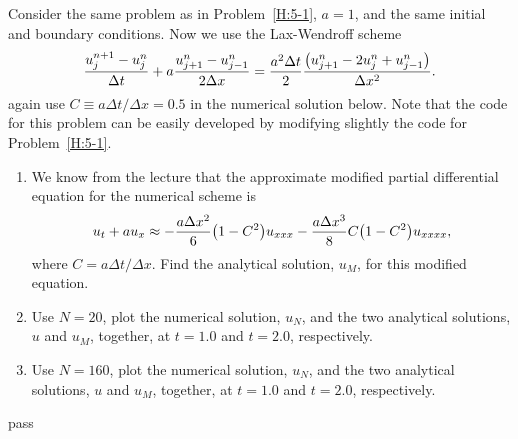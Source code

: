 \begin{homework}[label={H:5-2}]
    Consider the same problem as in Problem~\ref{H:5-1}, $a=1$, and the same initial and boundary conditions. Now we use the Lax-Wendroff scheme
    \begin{equation}\label{E:5-2-1}
        \frac{u^{n+1}_j-u^n_j}{\Delta t} + a\frac{u^n_{j+1}-u^n_{j-1}}{2\Delta x}
        =
        \frac{a^2\Delta t}{2}\frac{\qty(u^n_{j+1}-2u^n_j+u^n_{j-1})}{\Delta x^2}.
    \end{equation}
    again use $C\equiv a\Delta t/\Delta x=0.5$ in the numerical solution below. Note that the code for this problem can be easily developed by modifying slightly the code for Problem~\ref{H:5-1}.

    \begin{enumerate}[label=(\alph*)]
        \item We know from the lecture that the approximate modified partial differential equation for the numerical scheme is
            \begin{equation}\label{E:5-2-2}
                u_t+au_x
                \approx
                -\frac{a\Delta x^2}{6}\qty(1-C^2)u_{xxx} - \frac{a\Delta x^3}{8}C\qty(1-C^2)u_{xxxx},
            \end{equation}
            where $C=a\Delta t/\Delta x$. Find the analytical solution, $u_M$, for this modified equation.
        \item Use $N=20$, plot the numerical solution, $u_N$, and the two analytical solutions, $u$ and $u_M$, together, at $t=1.0$ and $t=2.0$, respectively.
        \item Use $N=160$, plot the numerical solution, $u_N$, and the two analytical solutions, $u$ and $u_M$, together, at $t=1.0$ and $t=2.0$, respectively.   
    \end{enumerate}
\end{homework}

pass




